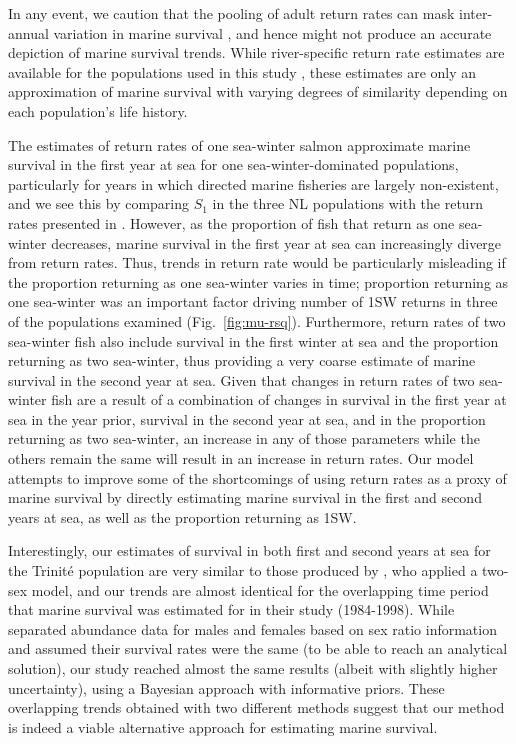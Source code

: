 \documentclass[12pt]{article}
\begin{document}
In any event, we caution that the pooling of adult return rates
\citep{Chaput2012a, Friedland1993,Gibson2016} can mask inter-annual
variation in marine survival \citep{Hubley2011}, and hence might not produce
an accurate depiction of marine survival trends.
While river-specific return rate estimates are available for the populations
used in this study \citep{ICES2019}, these estimates are only an approximation
of marine survival with varying degrees of similarity depending on each
population's life history.

The estimates of return rates of one sea-winter salmon
approximate marine survival in the first year at sea for one
sea-winter-dominated populations, particularly for years in which
directed marine fisheries are largely non-existent,
and we see this by comparing $S_1$ in the three NL populations
with the return rates presented in \citet{ICES2019}. However, as the proportion of fish that
return as one sea-winter decreases, marine survival in the first year at sea
can increasingly diverge from return rates. Thus, trends in return rate
would be particularly misleading if the proportion returning as one sea-winter
varies in time;
proportion returning as one sea-winter was an important factor driving number of
1SW returns in three of the populations examined (Fig.~\ref{fig:mu-rsq}).
Furthermore, return rates of two sea-winter fish also include survival in the
first winter at sea and the proportion returning as two sea-winter, thus
providing a very coarse estimate of marine survival in the second year at sea.
Given that changes in return rates of two sea-winter fish are a result of a
combination of changes in survival in the first year at sea in the year prior,
survival in the second year at sea, and in the proportion returning as two
sea-winter, an increase in any of those parameters while the others remain
the same will result in an increase in return rates. Our model attempts to
improve some of the shortcomings of using return rates as a proxy of marine
survival by directly estimating marine survival in the first and second years
at sea, as well as the proportion returning as 1SW.

Interestingly, our estimates of survival in both first and second years at sea
for the Trinit\'{e} population are very similar to those produced by
\citet{Chaput2003b}, who applied a two-sex model, and our trends are almost identical
for the overlapping time period that marine survival was estimated for in
their study (1984-1998). While \citet{Chaput2003b} separated abundance data
for males and females based on sex ratio information and assumed their
survival rates were the same (to be able to reach an analytical solution), our
study reached almost the same results (albeit with slightly higher
uncertainty), using a Bayesian approach with informative priors. These overlapping
trends obtained with two different methods suggest that our method is indeed
a viable alternative approach for estimating marine survival.
\end{document}
